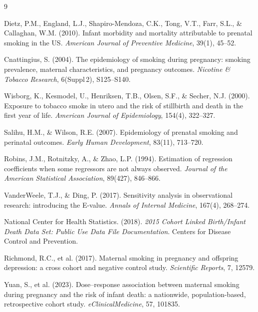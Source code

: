 \documentclass[11pt]{article}
\begin{document}
\newpage

{\small
\begin{thebibliography}{9}

Dietz, P.M., England, L.J., Shapiro-Mendoza, C.K., Tong, V.T., Farr, S.L., \& Callaghan, W.M. (2010).
Infant morbidity and mortality attributable to prenatal smoking in the US.
\textit{American Journal of Preventive Medicine}, 39(1), 45--52.

Cnattingius, S. (2004).
The epidemiology of smoking during pregnancy: smoking prevalence, maternal characteristics, and pregnancy outcomes.
\textit{Nicotine \& Tobacco Research}, 6(Suppl\,2), S125--S140.

Wisborg, K., Kesmodel, U., Henriksen, T.B., Olsen, S.F., \& Secher, N.J. (2000).
Exposure to tobacco smoke in utero and the risk of stillbirth and death in the first year of life.
\textit{American Journal of Epidemiology}, 154(4), 322--327.

Salihu, H.M., \& Wilson, R.E. (2007).
Epidemiology of prenatal smoking and perinatal outcomes.
\textit{Early Human Development}, 83(11), 713--720.

Robins, J.M., Rotnitzky, A., \& Zhao, L.P. (1994).
Estimation of regression coefficients when some regressors are not always observed.
\textit{Journal of the American Statistical Association}, 89(427), 846--866.

VanderWeele, T.J., \& Ding, P. (2017).
Sensitivity analysis in observational research: introducing the E-value.
\textit{Annals of Internal Medicine}, 167(4), 268--274.

National Center for Health Statistics. (2018).
\textit{2015 Cohort Linked Birth/Infant Death Data Set: Public Use Data File Documentation}.
Centers for Disease Control and Prevention.


Richmond, R.C., et al. (2017).
Maternal smoking in pregnancy and offspring depression: a cross cohort
and negative control study.
\textit{Scientific Reports}, 7, 12579.

Yuan, S., et al. (2023).
Dose--response association between maternal smoking during pregnancy
and the risk of infant death: a nationwide, population-based,
retrospective cohort study.
\textit{eClinicalMedicine}, 57, 101835.


\end{thebibliography}
}
\end{document}
